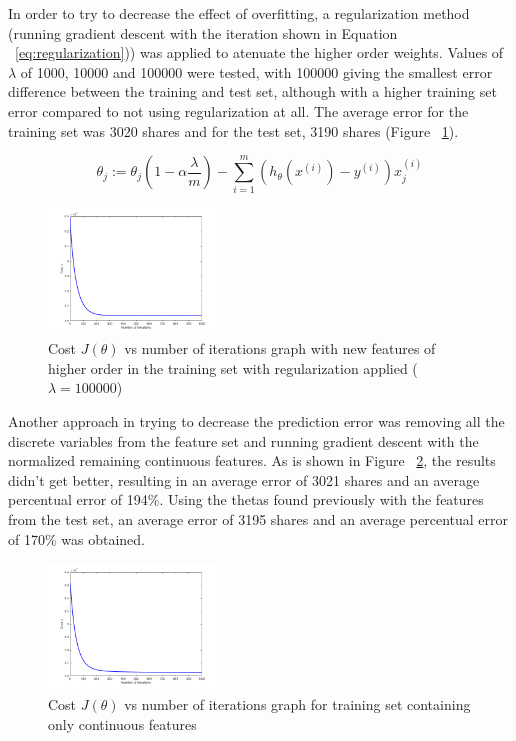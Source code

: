 \documentclass[10pt,twocolumn,letterpaper]{article}
\begin{document}
In order to try to decrease the effect of overfitting, a regularization method (running gradient descent with the iteration shown in Equation ~\ref{eq:regularization})) was applied to atenuate the higher order weights. Values of $\lambda$ of 1000, 10000 and 100000 were tested, with 100000 giving the smallest error difference between the training and test set, although with a higher training set error compared to not using regularization at all. The average error for the training set was 3020 shares and for the test set, 3190 shares (Figure ~\ref{fig:power_12_with_reg}).

\begin{equation}\label{eq:regularization}
\theta_{j} := \theta_{j}(1 - \alpha \dfrac{\lambda}{m}) - \sum\limits_{i=1}^m  (h_{\theta}(x^{(i)})-y^{(i)})x_{j}^{(i)}
\end{equation}

\begin{figure}[H]
\begin{center}
	\includegraphics[width=0.4\textwidth]{pics/power_12_with_reg_100k}
	\caption{Cost $J(\theta)$ vs number of iterations graph with new features of higher order in the training set with regularization applied ($\lambda = 100000$)\label{fig:power_12_with_reg}}
\end{center} 
\end{figure}   

Another approach in trying to decrease the prediction error was removing all the discrete variables from the feature set and running gradient descent with the normalized remaining continuous features. As is shown in Figure ~\ref{fig:third_run_label}, the results didn't get better, resulting in an average error of 3021 shares and an average percentual error of 194$\%$. Using the thetas found previously with the features from the test set, an average error of 3195 shares and an average percentual error of 170$\%$ was obtained.

\begin{figure}[H]
\begin{center}
	\includegraphics[width=0.4\textwidth]{pics/third_run_001_1000}
	\caption{Cost $J(\theta)$ vs number of iterations graph for training set containing only continuous features\label{fig:third_run_label}}
\end{center} 
\end{figure}   
\end{document}
